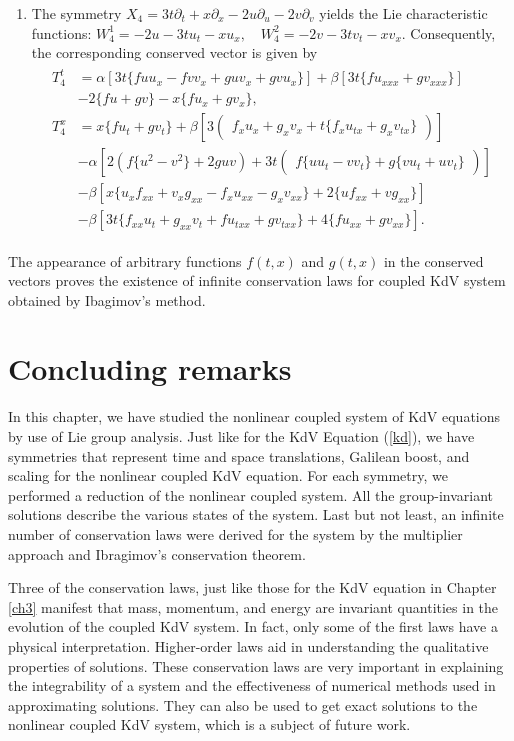 \begin{enumerate} 
\item The symmetry $ X_4 = 3t  \partial_t + x \partial_x - 2 u \partial_u-2 v  \partial_v$ yields  the Lie characteristic functions: 
$W_4^1 =-2u -3tu_t-xu_x, \quad  W_4^2 =-2v -3tv_t-xv_x.
$ Consequently, the  corresponding conserved vector is given by
\begin{align} \begin{aligned} T_4^t&=\alpha \left[ 3t \{fuu_x-fvv_x+guv_x+gvu_x \}  \right]+ \beta \left[ 3t\{ fu_{xxx} + gv_{xxx}\}\right]\\& -2\{fu+gv \}-x\{ fu_x+gv_x\},
\\
T_4^x& = x\{fu_t+gv_t \}+ \beta\left[ 3\begin{pmatrix} f_xu_x+g_xv_x+t\{ f_xu_{tx} +g_x v_{tx} \} \end{pmatrix}\right]\\& 
-\alpha \left[2 \left(f \{u^2-v^2 \}+2guv \right)+3t\begin{pmatrix} f\{ uu_t-vv_t\}+g\{vu_t+uv_t\} \end{pmatrix}\right] \\&
-\beta \left[ x \{ u_xf_{xx}+v_xg_{xx}-f_xu_{xx}-g_xv_{xx} \} +2 \{ uf_{xx} + vg_{xx}\}\right]\\&
-\beta \left[ 3t \{ f_{xx}u_t+g_{xx}v_t+ fu_{txx} + gv_{txx}\} + 4 \{ fu_{xx} + gv_{xx}\}\right].
\end{aligned}
\end{align} 
\end{enumerate}
\begin{rem}
The appearance of arbitrary functions $f(t,x)$ and $g(t,x)$ in the conserved vectors proves the existence of infinite conservation laws for coupled KdV system obtained by Ibagimov's method.
\end{rem}
\section{Concluding remarks}
In this chapter, we have studied the nonlinear coupled system of  KdV equations by use of Lie group analysis. Just like for the KdV 
Equation (\ref{kd}), we have symmetries that represent time and space translations, Galilean boost, and scaling for the nonlinear coupled KdV equation. For each symmetry, we performed a  reduction of the nonlinear coupled system.
All the group-invariant solutions describe the various states of the system.  Last but not least, an infinite number of conservation laws were derived for the system by the multiplier approach and Ibragimov's conservation theorem.

Three of the conservation laws, just like those for the KdV equation in Chapter \ref{ch3} manifest that mass, momentum, and energy are invariant quantities in the evolution of the coupled KdV system. In fact, only some of the first laws have a physical interpretation. Higher-order laws aid in understanding the qualitative properties of solutions. These conservation laws are very important in explaining the integrability of a system and the effectiveness of numerical methods used in approximating solutions. They can also be used to get exact solutions to the nonlinear coupled KdV system, which is a subject of future work.